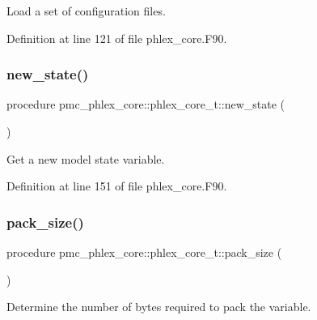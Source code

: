 Load a set of configuration files. 



Definition at line 121 of file phlex\+\_\+core.\+F90.

\mbox{\label{structpmc__phlex__core_1_1phlex__core__t_aad616d6150b13d08a9fc418e274d536e}} 
\subsubsection{\texorpdfstring{new\+\_\+state()}{new\_state()}}
{\footnotesize\ttfamily procedure pmc\+\_\+phlex\+\_\+core\+::phlex\+\_\+core\+\_\+t\+::new\+\_\+state (\begin{DoxyParamCaption}{ }\end{DoxyParamCaption})\hspace{0.3cm}{\ttfamily [private]}}



Get a new model state variable. 



Definition at line 151 of file phlex\+\_\+core.\+F90.

\mbox{\label{structpmc__phlex__core_1_1phlex__core__t_aaa3fbf2d93bc6c6dac0879bba28a096f}} 
\subsubsection{\texorpdfstring{pack\+\_\+size()}{pack\_size()}}
{\footnotesize\ttfamily procedure pmc\+\_\+phlex\+\_\+core\+::phlex\+\_\+core\+\_\+t\+::pack\+\_\+size (\begin{DoxyParamCaption}{ }\end{DoxyParamCaption})\hspace{0.3cm}{\ttfamily [private]}}



Determine the number of bytes required to pack the variable. 




